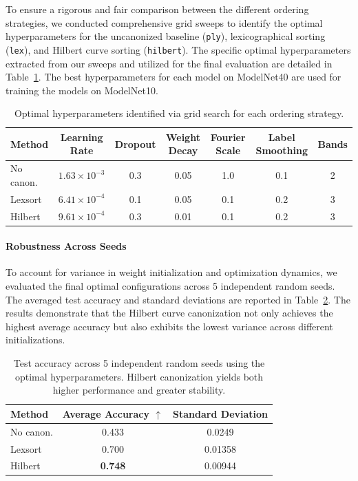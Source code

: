 \documentclass{article}
\begin{document}
To ensure a rigorous and fair comparison between the different ordering strategies, we conducted comprehensive grid sweeps to identify the optimal hyperparameters for the uncanonized baseline (\texttt{ply}), lexicographical sorting (\texttt{lex}), and Hilbert curve sorting (\texttt{hilbert}). The specific optimal hyperparameters extracted from our sweeps and utilized for the final evaluation are detailed in Table~\ref{tab:hyperparams}.
The best hyperparameters for each model on ModelNet40 are used for training the models on ModelNet10. 
\begin{table}[h]
\centering
\caption{Optimal hyperparameters identified via grid search for each ordering strategy.}
\label{tab:hyperparams}
\begin{tabular}{lcccccc}
\toprule
\textbf{Method} & \textbf{Learning Rate} & \textbf{Dropout} & \textbf{Weight Decay} & \textbf{Fourier Scale} & \textbf{Label Smoothing} & \textbf{Bands} \\
\midrule
No canon. & $1.63 \times 10^{-3}$ & 0.3 & 0.05 & 1.0 & 0.1 & 2 \\
Lexsort  & $6.41 \times 10^{-4}$ & 0.1 & 0.05 & 0.1 & 0.2 & 3 \\
Hilbert  & $9.61 \times 10^{-4}$ & 0.3 & 0.01 & 0.1 & 0.2 & 3 \\
\bottomrule
\end{tabular}
\end{table}

\paragraph{Robustness Across Seeds}
To account for variance in weight initialization and optimization dynamics, we evaluated the final optimal configurations across 5 independent random seeds. The averaged test accuracy and standard deviations are reported in Table~\ref{tab:seed_robustness}. The results demonstrate that the Hilbert curve canonization not only achieves the highest average accuracy but also exhibits the lowest variance across different initializations.

\begin{table}[h]
\centering
\caption{Test accuracy across 5 independent random seeds using the optimal hyperparameters. Hilbert canonization yields both higher performance and greater stability.}
\label{tab:seed_robustness}
\begin{tabular}{lcc}
\toprule
\textbf{Method} & \textbf{Average Accuracy} $\uparrow$ & \textbf{Standard Deviation} \\
\midrule
No canon. & 0.433 & 0.0249 \\
Lexsort  & 0.700 & 0.01358 \\
Hilbert  & \textbf{0.748} & 0.00944 \\
\bottomrule
\end{tabular}
\end{table}
\end{document}
